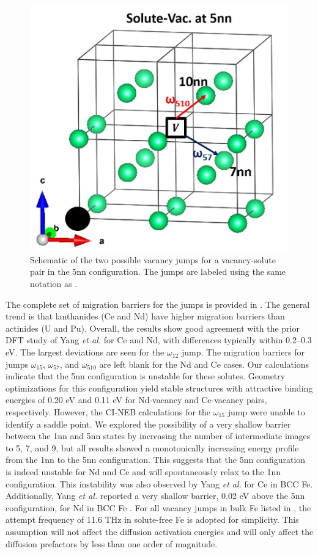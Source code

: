 \documentclass[preprint,12pt]{elsarticle}
\begin{document}
\begin{figure}[h!]
    \centering
    \includegraphics[width=0.5\linewidth]{5nn_jumps_fe.jpg}
    \caption{Schematic of the two possible vacancy jumps for a vacancy-solute pair in the 5nn configuration. The jumps are labeled using the same notation as .}
    \label{fig:jumps_5nn}
\end{figure}

\FloatBarrier

The complete set of migration barriers for the jumps is provided in . The general trend is that lanthanides (Ce and Nd) have higher migration barriers than actinides (U and Pu). Overall, the results show good agreement with the prior DFT study of Yang \textit{et al.} \cite{yang_significant_2023} for Ce and Nd, with differences typically within 0.2–0.3 eV. The largest deviations are seen for the $\omega_{12}$ jump. The migration barriers for jumps $\omega_{15}$, $\omega_{57}$, and $\omega_{510}$ are left blank for the Nd and Ce cases. Our calculations indicate that the 5nn configuration is unstable for these solutes. Geometry optimizations for this configuration yield stable structures with attractive binding energies of 0.20 eV and 0.11 eV for Nd-vacancy and Ce-vacancy pairs, respectively. However, the CI-NEB calculations for the $\omega_{15}$ jump were unable to identify a saddle point. We explored the possibility of a very shallow barrier between the 1nn and 5nn states by increasing the number of intermediate images to 5, 7, and 9, but all results showed a monotonically increasing energy profile from the 1nn to the 5nn configuration. This suggests that the 5nn configuration is indeed unstable for Nd and Ce and will spontaneously relax to the 1nn configuration. This instability was also observed by Yang \textit{et al.} \cite{yang_significant_2023} for Ce in BCC Fe. Additionally, Yang \textit{et al.} reported a very shallow barrier, 0.02 eV above the 5nn configuration, for Nd in BCC Fe \cite{yang_significant_2023}.
For all vacancy jumps in bulk Fe listed in , the attempt frequency of 11.6 THz \cite{messina_systematic_2016} in solute-free Fe is adopted for simplicity. This assumption will not affect the diffusion activation energies and will only affect the diffusion prefactors by less than one order of magnitude.
\end{document}
